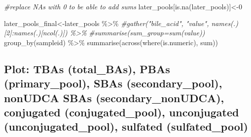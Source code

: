 \documentclass[
]{book}
\newenvironment{Shaded}{\begin{snugshade}}{\end{snugshade}}
\newcommand{\CommentTok}[1]{\textcolor[rgb]{0.56,0.35,0.01}{\textit{#1}}}
\newcommand{\DecValTok}[1]{\textcolor[rgb]{0.00,0.00,0.81}{#1}}
\newcommand{\FunctionTok}[1]{\textcolor[rgb]{0.00,0.00,0.00}{#1}}
\newcommand{\NormalTok}[1]{#1}
\newcommand{\OtherTok}[1]{\textcolor[rgb]{0.56,0.35,0.01}{#1}}
\newcommand{\SpecialCharTok}[1]{\textcolor[rgb]{0.00,0.00,0.00}{#1}}
\begin{document}
\begin{Shaded}
\begin{Highlighting}[]
\CommentTok{\#replace NAs with 0 to be able to add sums}
\NormalTok{later\_pools[}\FunctionTok{is.na}\NormalTok{(later\_pools)]}\OtherTok{\textless{}{-}}\DecValTok{0}

\NormalTok{later\_pools\_final}\OtherTok{\textless{}{-}}\NormalTok{later\_pools }\SpecialCharTok{\%\textgreater{}\%} 
  \CommentTok{\#gather("bile\_acid", "value", names(.)[2]:names(.)[ncol(.)]) \%\textgreater{}\% }
  \CommentTok{\#summarise(sum\_group=sum(value))}
  \FunctionTok{group\_by}\NormalTok{(sampleid) }\SpecialCharTok{\%\textgreater{}\%} 
  \FunctionTok{summarise}\NormalTok{(}\FunctionTok{across}\NormalTok{(}\FunctionTok{where}\NormalTok{(is.numeric), sum))}
\end{Highlighting}
\end{Shaded}

\hypertarget{plot-tbas-total_bas-pbas-primary_pool-sbas-secondary_pool-nonudca-sbas-secondary_nonudca-conjugated-conjugated_pool-unconjugated-unconjugated_pool-sulfated-sulfated_pool}{%
\subsection{Plot: TBAs (total\_BAs), PBAs (primary\_pool), SBAs (secondary\_pool), nonUDCA SBAs (secondary\_nonUDCA), conjugated (conjugated\_pool), unconjugated (unconjugated\_pool), sulfated (sulfated\_pool)}\label{plot-tbas-total_bas-pbas-primary_pool-sbas-secondary_pool-nonudca-sbas-secondary_nonudca-conjugated-conjugated_pool-unconjugated-unconjugated_pool-sulfated-sulfated_pool}}
\end{document}
